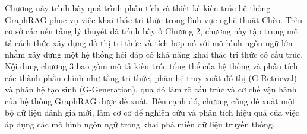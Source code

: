 
Chương này trình bày quá trình phân tích và thiết kế kiến trúc hệ thống GraphRAG phục vụ việc khai thác tri thức trong lĩnh vực nghệ thuật Chèo. Trên cơ sở các nền tảng lý thuyết đã trình bày ở Chương 2, chương này tập trung mô tả cách thức xây dựng đồ thị tri thức và tích hợp nó với mô hình ngôn ngữ lớn nhằm xây dựng một hệ thống hỏi đáp có khả năng khai thác tri thức có cấu trúc. Nội dung chương 3 bao gồm mô tả kiến trúc tổng thể của hệ thống và phân tích các thành phần chính như tầng tri thức, phân hệ truy xuất đồ thị (G-Retrieval) và phân hệ tạo sinh (G-Generation), qua đó làm rõ cấu trúc và cơ chế vận hành của hệ thống GraphRAG được đề xuất. Bên cạnh đó, chương cũng đề xuất một bộ dữ liệu đánh giá mới, làm cơ cơ để nghiên cứu và phân tích hiệu quả của việc áp dụng các mô hình ngôn ngữ trong khai phá miền dữ liệu truyền thống.

